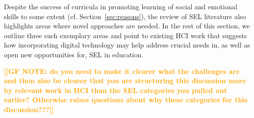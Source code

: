 \documentclass[prodmode,acmtochi]{acmsmall}
\newcommand{\Geraldine}[1]{\textrm{\textbf{\textcolor{Orange}{[[#1]]}}}}
\begin{document}
Despite the success of curricula in promoting learning of social and emotional skills to some extent (cf. Section~\ref{sec:reasons}), the review of SEL literature also highlights areas where novel approaches are needed. In the rest of this section, we outline three such exemplary areas and point to existing HCI work that suggests how incorporating digital technology may help address crucial needs in, as well as open new opportunities for, SEL in education. 



\Geraldine{GF NOTE: do you need to make it clearer what the challenges are and then also be clearer that you are structuring this discussion more by relevant work in HCI than the SEL categories you pulled out earlier? Otherwise raises questions about why these categories for this discussion???}


%




\end{document}
